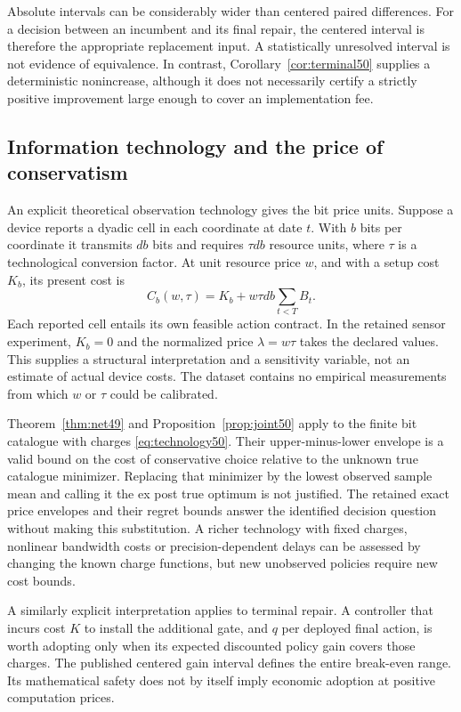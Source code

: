 Absolute intervals can be considerably wider than centered paired differences. For a decision between an incumbent and its final repair, the centered interval is therefore the appropriate replacement input. A statistically unresolved interval is not evidence of equivalence. In contrast, Corollary~\ref{cor:terminal50} supplies a deterministic nonincrease, although it does not necessarily certify a strictly positive improvement large enough to cover an implementation fee.

\subsection{Information technology and the price of conservatism}\label{sec:technology50}
An explicit theoretical observation technology gives the bit price units. Suppose a device reports a dyadic cell in each coordinate at date $t$. With $b$ bits per coordinate it transmits $db$ bits and requires $\tau db$ resource units, where $\tau$ is a technological conversion factor. At unit resource price $w$, and with a setup cost $K_b$, its present cost is
\begin{equation}\label{eq:technology50}
 C_b(w,\tau)=K_b+w\tau db\sum_{t<T}B_t.
\end{equation}
Each reported cell entails its own feasible action contract. In the retained sensor experiment, $K_b=0$ and the normalized price $\lambda=w\tau$ takes the declared values. This supplies a structural interpretation and a sensitivity variable, not an estimate of actual device costs. The dataset contains no empirical measurements from which $w$ or $\tau$ could be calibrated.

Theorem~\ref{thm:net49} and Proposition~\ref{prop:joint50} apply to the finite bit catalogue with charges \eqref{eq:technology50}. Their upper-minus-lower envelope is a valid bound on the cost of conservative choice relative to the unknown true catalogue minimizer. Replacing that minimizer by the lowest observed sample mean and calling it the ex post true optimum is not justified. The retained exact price envelopes and their regret bounds answer the identified decision question without making this substitution. A richer technology with fixed charges, nonlinear bandwidth costs or precision-dependent delays can be assessed by changing the known charge functions, but new unobserved policies require new cost bounds.

A similarly explicit interpretation applies to terminal repair. A controller that incurs cost $K$ to install the additional gate, and $q$ per deployed final action, is worth adopting only when its expected discounted policy gain covers those charges. The published centered gain interval defines the entire break-even range. Its mathematical safety does not by itself imply economic adoption at positive computation prices.
